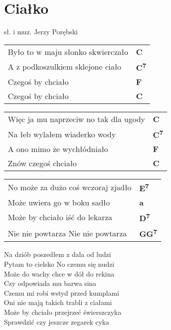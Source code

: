 \section{Ciałko}

sł. i muz. Jerzy Porębski\\


\vspace{2em}
\begin{tabular}{@{}p{10cm}@{}l@{}}
Było to w maju słonko skwierczało & \bfseries C\\
A z podkoszulkiem sklejone ciało & \bfseries C\textsuperscript{7}\\
Czegoś by chciało & \bfseries F\\
Czegoś by chciało & \bfseries C\\
\end{tabular}

\begin{tabular}{@{}p{10cm}@{}l@{}}
Więc ja mu naprzeciw no tak dla ugody & \bfseries C\\
Na łeb wylałem wiaderko wody & \bfseries C\textsuperscript{7}\\
A ono mimo że wychłódniało & \bfseries F\\
Znów czegoś chciało & \bfseries C\\
\end{tabular}

\begin{tabular}{@{}p{10cm}@{}l@{}}
No może za dużo coś wczoraj zjadło & \bfseries E\textsuperscript{7}\\
Może uwiera go w boku sadło & \bfseries a\\
Może by chciało iść do lekarza & \bfseries D\textsuperscript{7}\\
Nie nie powtarza Nie nie powtarza & \bfseries GG\textsuperscript{7}\\
\end{tabular}

\vspace{1em}
Na dziób poszedłem z dala od ludzi \\
Pytam to cielsko No czemu się nudzi \\
Może do wachy chce w dół do rekina \\
Czy odpowiada mu barwa sina \\

Czemu mi robi wstyd przed kumplami \\
Oni nie mają takich trabli z ciałami \\
Może by chciało przejrzeć świerszczyka \\
Sprawdzić czy jeszcze zegarek cyka \\

